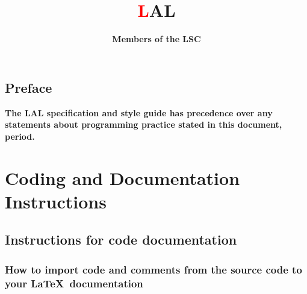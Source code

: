 \documentclass[oneside]{book}
\begin{document}

\title{\sffamily\bfseries\Huge
\textcolor{red}{\lsdfont L}AL
\hspace{-2em}
}
\author{\bf Members of the LSC}
\maketitle



\tableofcontents

\chapter*{Preface}
\textbf{The LAL specification and style guide has precedence over any
statements about programming practice stated in this document, period.}

\part{Coding and Documentation Instructions}

\chapter{Instructions for code documentation}
\section{How to import code and comments from the source code to 
your \LaTeX\ documentation}
\end{document}
